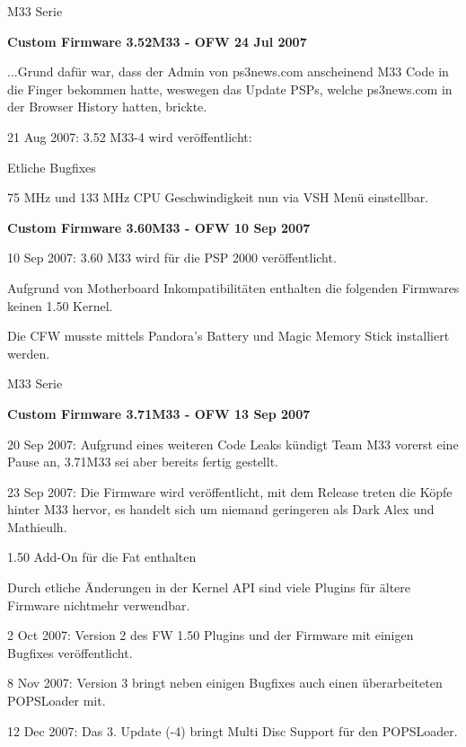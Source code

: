 \documentclass[mode=print,paper=screen,size=10pt,style=paintings]{powerdot}
\begin{document}
\begin{slide}{M33 Serie}
	\begin{large}\textbf{Custom Firmware 3.52M33 - OFW 24 Jul 2007}\end{large}\linebreak
	...Grund dafür war, dass der Admin von ps3news.com anscheinend M33 Code in die Finger bekommen hatte, weswegen das Update
	PSPs, welche ps3news.com in der Browser History hatten, brickte.
	\begin{list}{-}{}
		\item{21 Aug 2007: 3.52 M33-4 wird veröffentlicht:\begin{list}{*}{}
				\item{Etliche Bugfixes}
				\item{75 MHz und 133 MHz CPU Geschwindigkeit nun via VSH Menü einstellbar.}
			\end{list}}
	\end{list}
	\begin{large}\textbf{Custom Firmware 3.60M33 - OFW 10 Sep 2007}\end{large}
	\begin{list}{-}{}
		\item{10 Sep 2007: 3.60 M33 wird für die PSP 2000 veröffentlicht.}
		\item{Aufgrund von Motherboard Inkompatibilitäten enthalten die folgenden Firmwares keinen 1.50 Kernel.}
		\item{Die CFW musste mittels Pandora's Battery und Magic Memory Stick installiert werden.} 
	\end{list}
\end{slide}

\begin{slide}{M33 Serie}
	\begin{large}\textbf{Custom Firmware 3.71M33 - OFW 13 Sep 2007}\end{large}	
	\begin{list}{-}{}
		\item{20 Sep 2007: Aufgrund eines weiteren Code Leaks kündigt Team M33 vorerst eine Pause an, 3.71M33 sei aber bereits
			fertig gestellt.}
		\item{23 Sep 2007: Die Firmware wird veröffentlicht, mit dem Release treten die Köpfe hinter M33 hervor, es handelt sich
			um niemand geringeren als Dark Alex und Mathieulh.
			\begin{list}{*}{}
				\item{1.50 Add-On für die Fat enthalten}
				\item{Durch etliche Änderungen in der Kernel API sind viele Plugins für ältere Firmware nichtmehr verwendbar.}
			\end{list}}
		\item{2 Oct 2007: Version 2 des FW 1.50 Plugins und der Firmware mit einigen Bugfixes veröffentlicht.}
		\item{8 Nov 2007: Version 3 bringt neben einigen Bugfixes auch einen überarbeiteten POPSLoader mit.}
		\item{12 Dec 2007: Das 3. Update (-4) bringt Multi Disc Support für den POPSLoader.}
	\end{list}
\end{slide}
\end{document}

